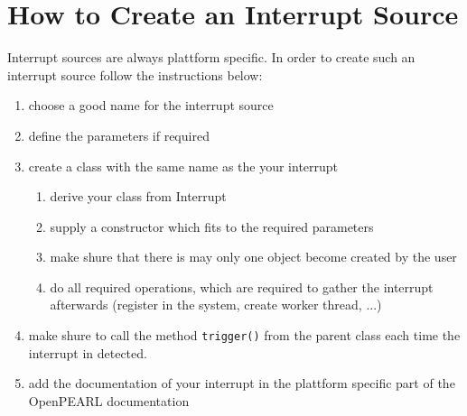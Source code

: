 \section{How to Create an Interrupt Source}
Interrupt sources are always plattform specific.
In order to create such an interrupt source follow the instructions below:
\begin{enumerate}
\item choose a good name for the interrupt source
\item define the parameters if required
\item create a class with the same name as the your interrupt 
  \begin{enumerate}
  \item  derive your class from Interrupt  
  \item supply a constructor which fits to the required parameters
  \item make shure that there is may only one object become created
        by the user
  \item do all required operations, which are required to gather 
        the interrupt afterwards (register in the system, create 
        worker thread, ...)
  \end{enumerate}
\item make shure to call the method \verb|trigger()| from the parent
      class each time the interrupt in detected.
\item add the documentation of your interrupt in the plattform specific part
      of the OpenPEARL documentation
\end{enumerate}

